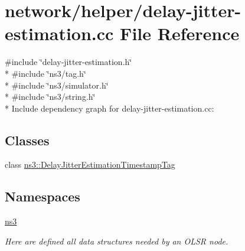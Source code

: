 \hypertarget{delay-jitter-estimation_8cc}{}\section{network/helper/delay-\/jitter-\/estimation.cc File Reference}
\label{delay-jitter-estimation_8cc}
{\ttfamily \#include \char`\"{}delay-\/jitter-\/estimation.\+h\char`\"{}}\\*
{\ttfamily \#include \char`\"{}ns3/tag.\+h\char`\"{}}\\*
{\ttfamily \#include \char`\"{}ns3/simulator.\+h\char`\"{}}\\*
{\ttfamily \#include \char`\"{}ns3/string.\+h\char`\"{}}\\*
Include dependency graph for delay-\/jitter-\/estimation.cc\+:
\subsection*{Classes}
\begin{DoxyCompactItemize}
\item 
class \hyperlink{classns3_1_1DelayJitterEstimationTimestampTag}{ns3\+::\+Delay\+Jitter\+Estimation\+Timestamp\+Tag}
\end{DoxyCompactItemize}
\subsection*{Namespaces}
\begin{DoxyCompactItemize}
\item 
 \hyperlink{namespacens3}{ns3}
\begin{DoxyCompactList}\small\item\em Here are defined all data structures needed by an O\+L\+SR node. \end{DoxyCompactList}\end{DoxyCompactItemize}
